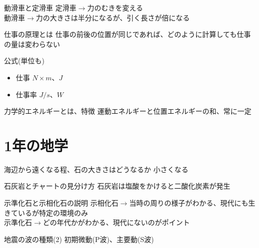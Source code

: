 \documentclass[10pt,dvipdfmx]{jsarticle}
\newcommand{\answer}[2]{{\color{orange}#2}}
\newcommand{\answer}[2]{\vspace{#1mm}}
\begin{document}
\begin{itembox}[l]{動滑車と定滑車}
	\answer{10}{
		定滑車$\rightarrow$力のむきを変える\\
		動滑車$\rightarrow$力の大きさは半分になるが、引く長さが倍になる
	}
\end{itembox}

\begin{itembox}[l]{仕事の原理とは}
	\answer{10}{
		仕事の前後の位置が同じであれば、どのように計算しても仕事の量は変わらない
	}
\end{itembox}

\begin{itembox}[l]{公式(単位も)}
	\begin{Large}
		\begin{itemize}
			\item 仕事 \answer{0}{$N\times m、J$}
			\item 仕事率 \answer{0}{$J/s、 W$}
		\end{itemize}
	\end{Large}
\end{itembox}

\begin{itembox}[l]{力学的エネルギーとは、特徴}
	\answer{10}{
		運動エネルギーと位置エネルギーの和、常に一定
	}
\end{itembox}

\newpage

\section{1年の地学}
\begin{itembox}[l]{海辺から遠くなる程、石の大きさはどうなるか}
	\answer{10}{小さくなる}
\end{itembox}

\begin{itembox}[l]{石灰岩とチャートの見分け方}
	\answer{10}{石灰岩は塩酸をかけると二酸化炭素が発生}
\end{itembox}

\begin{itembox}[l]{示準化石と示相化石の説明}
	\answer{10}{
		示相化石$\rightarrow$当時の周りの様子がわかる、現代にも生きているが特定の環境のみ\\
		示準化石$\rightarrow$どの年代かがわかる、現代にないのがポイント
	}
\end{itembox}

\begin{itembox}[l]{地震の波の種類(2)}
	\answer{10}{
		初期微動(P波)、主要動(S波)
	}
\end{itembox}
\end{document}
